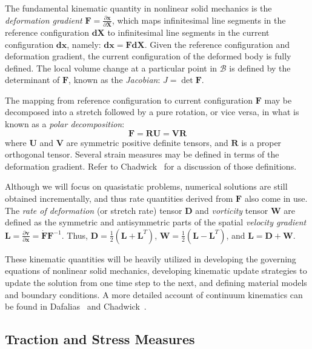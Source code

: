 The fundamental kinematic quantity in nonlinear solid mechanics is the \textit{deformation gradient} $\bm{F} = \frac{\partial \bm{x}}{\partial \bm{X}}$, which maps infinitesimal line segments in the reference configuration $\bm{dX}$ to infinitesimal line segments in the current configuration $\bm{dx}$, namely: $\bm{dx} = \bm{F}\bm{dX}$. Given the reference configuration and deformation gradient, the current configuration of the deformed body is fully defined. The local volume change at a particular point in $\mathcal{B}$ is defined by the determinant of $\bm{F}$, known as the \textit{Jacobian}: $J = \det{\bm{F}}$.

The mapping from reference configuration to current configuration $\bm{F}$ may be decomposed into a  stretch followed by a pure rotation, or vice versa, in what is known as a \textit{polar decomposition}:
\begin{equation}
\bm{F} = \bm{R}\bm{U} = \bm{V}\bm{R}
\end{equation}
where $\bm{U}$ and $\bm{V}$ are symmetric positive definite tensors, and $\bm{R}$ is a proper orthogonal tensor. Several strain measures may be defined in terms of the deformation gradient. Refer to Chadwick~\cite{chadwick_1999} for a discussion of those definitions.

Although we will focus on quasistatic problems, numerical solutions are still obtained incrementally, and thus rate quantities derived from $\bm{F}$ also come in use. The \textit{rate of deformation} (or stretch rate) tensor $\bm{D}$ and \textit{vorticity} tensor $\bm{W}$ are defined as the symmetric and antisymmetric parts of the spatial \textit{velocity gradient} $\bm{L} = \frac{\partial \bm{v}}{\partial \bm{x}} = \dot{\bm{F}}{\bm{F}}^{-1}$. Thus, $\bm{D} = \frac{1}{2}(\bm{L} + \bm{L}^T)$, $\bm{W} = \frac{1}{2}(\bm{L} - \bm{L}^T)$, and $\bm{L} = \bm{D} + \bm{W}$.

These kinematic quantities will be heavily utilized in developing the governing equations of nonlinear solid mechanics, developing kinematic update strategies to update the solution from one time step to the next, and defining material models and boundary conditions. A more detailed account of continuum kinematics can be found in Dafalias~\cite{dafalias_205} and Chadwick~\cite{chadwick_1999}.

\subsection{Traction and Stress Measures}


